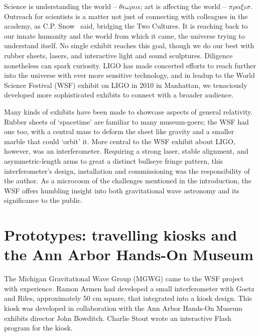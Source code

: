 
Science is understanding the world -- $\theta \epsilon \omega \rho \iota \alpha $; art is affecting the world -- $ \pi \rho \alpha \xi \iota \sigma $.
Outreach for scientists is a matter not just of connecting with colleagues in the academy, as C.P. Snow~\cite{SnowTwoCultures} said, bridging the Two Cultures.
It is reaching back to our innate humanity and the world from which it came, the universe trying to understand itself. 
No single exhibit reaches this goal, though we do our best with rubber sheets, lasers, and interactive light and sound sculptures. 
Diligence nonetheless can spark curiosity.
LIGO has made concerted efforts to reach further into the universe with ever more sensitive technology, and in leadup to the World Science Festival (WSF) exhibit on LIGO in 2010 in Manhattan, we tenaciously developed more sophisticated exhibits to connect with a broader audience. 

Many kinds of exhibits have been made to showcase aspects of general relativity.
Rubber sheets of `spacetime' are familiar to many museum-goers; the WSF had one too, with a central mass to deform the sheet like gravity and a smaller marble that could `orbit' it.
More central to the WSF exhibit about LIGO, however, was an interferometer.
Requiring a strong laser, stable alignment, and asymmetric-length arms to great a distinct bullseye fringe pattern, this interferometer's design, installation and commissioning was the responsibility of the author.
As a microcosm of the challenges mentioned in the introduction, the WSF offers humbling insight into both gravitational wave astronomy and its significance to the public.


    \section{Prototypes: travelling kiosks and the Ann Arbor Hands-On Museum} 
    \label{prototypes}


The Michigan Gravitational Wave Group (MGWG) came to the WSF project with experience.
Ramon Armen had developed a small interferometer with Goetz and Riles, approximately 50 cm square, that integrated into a kiosk design.
This kiosk was developed in collaboration with the Ann Arbor Hands-On Museum exhibits director John Bowditch.
Charlie Stout wrote an interactive Flash program for the kiosk.

